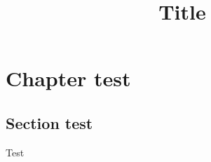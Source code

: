 \documentclass[a4paper,12pt,twoside]{book}
\title{Title}
\begin{document}
\setlength{\baselineskip}{.55cm}



\newpage
\pagestyle{intr}

\newpage

\pagestyle{toc}
\tableofcontents
\newpage

\pagestyle{toenv}
\listoftheorems
\newpage

\pagestyle{nor}
\chapter{Chapter test}
\section{Section test}
\begin{definition}
Test
\end{definition}


\medskip
\printbibliography[heading=bibintoc]

\end{document}
